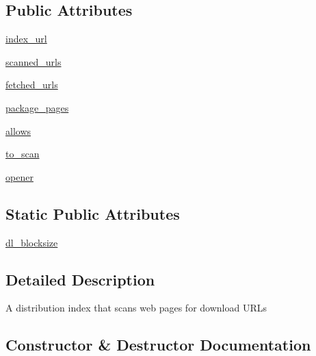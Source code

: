 \subsection*{Public Attributes}
\begin{DoxyCompactItemize}
\item 
\hyperlink{classsetuptools_1_1package__index_1_1PackageIndex_a880d354bb91944645d4a722ca09a882a}{index\+\_\+url}
\item 
\hyperlink{classsetuptools_1_1package__index_1_1PackageIndex_a1b19cf2d09314c588a24a9b4fb48ebf8}{scanned\+\_\+urls}
\item 
\hyperlink{classsetuptools_1_1package__index_1_1PackageIndex_a6a6207235d64b4b520712153f9c697d1}{fetched\+\_\+urls}
\item 
\hyperlink{classsetuptools_1_1package__index_1_1PackageIndex_a211df1c12665d1f6de7e2099a3aed30d}{package\+\_\+pages}
\item 
\hyperlink{classsetuptools_1_1package__index_1_1PackageIndex_ae064a13c505539a8447e3fbb527c26b5}{allows}
\item 
\hyperlink{classsetuptools_1_1package__index_1_1PackageIndex_a8e17032ca68311191142a563ec67c3e6}{to\+\_\+scan}
\item 
\hyperlink{classsetuptools_1_1package__index_1_1PackageIndex_ab91302a7a7b70255404a48b19dc7e2f7}{opener}
\end{DoxyCompactItemize}
\subsection*{Static Public Attributes}
\begin{DoxyCompactItemize}
\item 
\hyperlink{classsetuptools_1_1package__index_1_1PackageIndex_a70baeb1c0096f519c9c0281821a838e9}{dl\+\_\+blocksize}
\end{DoxyCompactItemize}


\subsection{Detailed Description}
\begin{DoxyVerb}A distribution index that scans web pages for download URLs\end{DoxyVerb}
 

\subsection{Constructor \& Destructor Documentation}
\mbox{\label{classsetuptools_1_1package__index_1_1PackageIndex_ac7be93ac686f243570e0631069e2c7d6}} 
